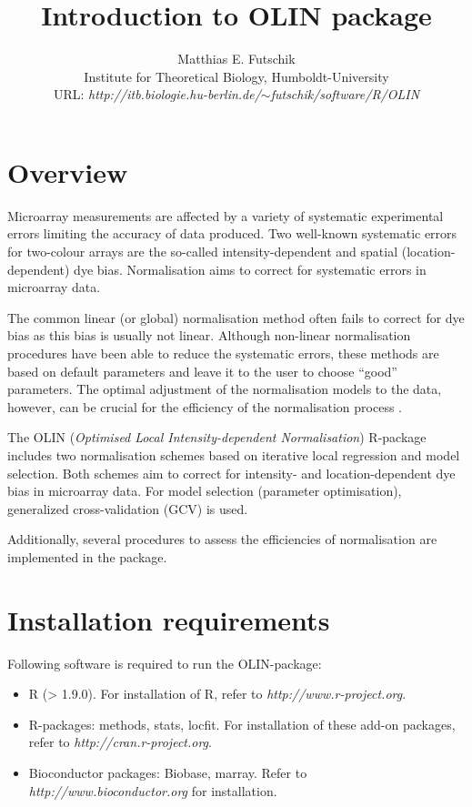 \documentclass[a4paper,11pt]{article}
\title{Introduction to OLIN package }
\author{Matthias E. Futschik\\ Institute for Theoretical Biology,  Humboldt-University\\ URL: \textit{http://itb.biologie.hu-berlin.de/$\sim$futschik/software/R/OLIN}}
\begin{document}
\maketitle
\tableofcontents

\section{Overview}
Microarray measurements are affected by a variety of systematic experimental errors 
limiting the accuracy of data produced. 
Two well-known systematic errors for two-colour arrays are    
the so-called intensity-dependent and spatial (location-dependent) dye bias. 
Normalisation aims to correct for systematic errors in microarray data.

The common linear (or global) normalisation method  often fails to correct for dye  bias 
as this bias is usually not linear.  Although non-linear normalisation procedures have been 
able to reduce the systematic errors,
these methods are based on default parameters and leave it to the user to choose ``good'' 
parameters. The optimal adjustment of the normalisation models to the data, however,
can be crucial for the efficiency of the normalisation process \cite{toni}. 

The OLIN (\textit{Optimised Local Intensity-dependent Normalisation})  
R-package includes two normalisation schemes based on iterative  local regression
and model selection. Both  schemes aim to correct for intensity- and location-dependent  dye bias in  microarray data. For model selection (parameter optimisation), generalized cross-validation (GCV) is used. 

Additionally, several procedures to assess the efficiencies of normalisation are implemented
in the package. 


\section{Installation requirements}
Following software is required to run the OLIN-package:
\begin{itemize} 
\item  R (> 1.9.0). For installation of R, refer to \textit{http://www.r-project.org}.
\item  R-packages: methods, stats, locfit. For installation of these add-on packages, refer to \textit{http://cran.r-project.org}.
\item Bioconductor packages: Biobase, marray. Refer to \textit{http://www.bioconductor.org} for installation. 
\end{itemize}
\end{document}
